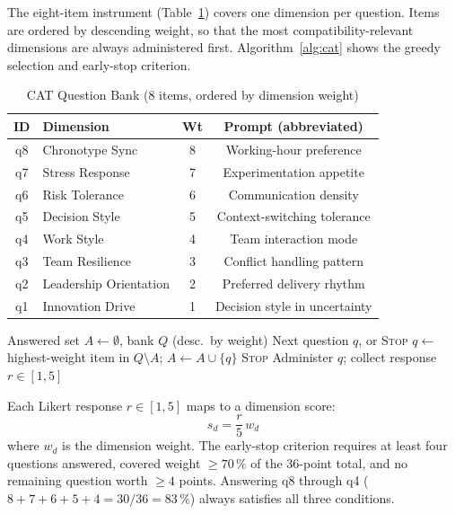 \documentclass[conference]{IEEEtran}
\begin{document}
The eight-item instrument (Table~\ref{tab:items}) covers one
dimension per question.  Items are ordered by descending weight,
so that the most compatibility-relevant dimensions are always
administered first.  Algorithm~\ref{alg:cat} shows the greedy
selection and early-stop criterion.

\begin{table}[t]
\caption{CAT Question Bank (8 items, ordered by dimension weight)}
\label{tab:items}
\centering
\small
\setlength{\tabcolsep}{5pt}
\begin{tabular}{clcc}
\toprule
ID & Dimension & Wt & Prompt (abbreviated) \\
\midrule
q8 & Chronotype Sync        & 8 & Working-hour preference \\
q7 & Stress Response        & 7 & Experimentation appetite \\
q6 & Risk Tolerance         & 6 & Communication density \\
q5 & Decision Style         & 5 & Context-switching tolerance \\
q4 & Work Style             & 4 & Team interaction mode \\
q3 & Team Resilience        & 3 & Conflict handling pattern \\
q2 & Leadership Orientation & 2 & Preferred delivery rhythm \\
q1 & Innovation Drive       & 1 & Decision style in uncertainty \\
\bottomrule
\end{tabular}
\end{table}

\begin{algorithm}[t]
\caption{Greedy CAT with Early Stop}
\label{alg:cat}
\begin{algorithmic}[1]
\REQUIRE Answered set $A \leftarrow \emptyset$, bank $Q$ (desc.\ by weight)
\ENSURE Next question $q$, or \textsc{Stop}
\REPEAT
  \STATE $q \leftarrow$ highest-weight item in $Q \setminus A$;\;
    $A \leftarrow A \cup \{q\}$
    \RETURN \textsc{Stop}
  \ENDIF
  \STATE Administer $q$; collect response $r \in [1,5]$
\end{algorithmic}
\end{algorithm}

Each Likert response $r \in [1,5]$ maps to a dimension score:
\begin{equation}
  s_d = \frac{r}{5} \, w_d
  \label{eq:likert}
\end{equation}
where $w_d$ is the dimension weight.  The early-stop criterion
requires at least four questions answered, covered weight $\geq
70\,\%$ of the 36-point total, and no remaining question worth
$\geq 4$ points.  Answering q8 through q4
($8+7+6+5+4 = 30/36 = 83\,\%$) always satisfies all three
conditions.
\end{document}
